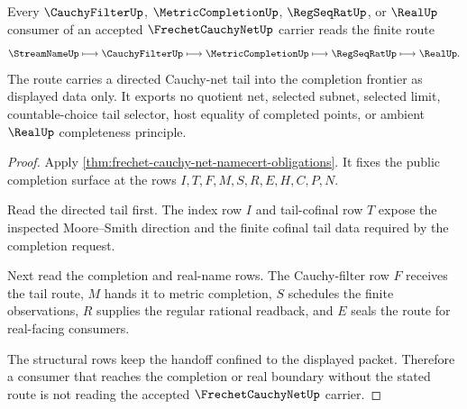 \begin{theorem}
\label{thm:frechet-cauchy-net-completion-handoff}
Every $\CauchyFilterUp$, $\MetricCompletionUp$, $\RegSeqRatUp$, or $\RealUp$ consumer of an accepted $\FrechetCauchyNetUp$ carrier reads the finite route
$$
\StreamNameUp \longmapsto \CauchyFilterUp \longmapsto \MetricCompletionUp \longmapsto \RegSeqRatUp \longmapsto \RealUp .
$$
The route carries a directed Cauchy-net tail into the completion frontier as displayed data only. It exports no quotient net, selected subnet, selected limit, countable-choice tail selector, host equality of completed points, or ambient $\RealUp$ completeness principle.
\end{theorem}
\begin{proof}
Apply \autoref{thm:frechet-cauchy-net-namecert-obligations}. It fixes the public completion surface at the rows $I,T,F,M,S,R,E,H,C,P,N$.

Read the directed tail first. The index row $I$ and tail-cofinal row $T$ expose the inspected Moore--Smith direction and the finite cofinal tail data required by the completion request.

Next read the completion and real-name rows. The Cauchy-filter row $F$ receives the tail route, $M$ hands it to metric completion, $S$ schedules the finite observations, $R$ supplies the regular rational readback, and $E$ seals the route for real-facing consumers.

The structural rows keep the handoff confined to the displayed packet. Therefore a consumer that reaches the completion or real boundary without the stated route is not reading the accepted $\FrechetCauchyNetUp$ carrier.
\end{proof}



